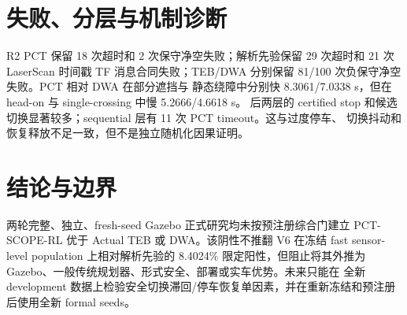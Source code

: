 \section{失败、分层与机制诊断}
R2 PCT 保留 18 次超时和 2 次保守净空失败；解析先验保留 29 次超时和 21 次 LaserScan 时间戳
TF 消息合同失败；TEB/DWA 分别保留 81/100 次负保守净空失败。PCT 相对 DWA 在部分遮挡与
静态绕障中分别快 8.3061/7.0338 s，但在 head-on 与 single-crossing 中慢 5.2666/4.6618 s。
后两层的 certified stop 和候选切换显著较多；sequential 层有 11 次 PCT timeout。这与过度停车、
切换抖动和恢复释放不足一致，但不是独立随机化因果证明。

\section{结论与边界}
两轮完整、独立、fresh-seed Gazebo 正式研究均未按预注册综合门建立 PCT-SCOPE-RL 优于 Actual
TEB 或 DWA。该阴性不推翻 V6 在冻结 fast sensor-level population 上相对解析先验的 8.4024\%
限定阳性，但阻止将其外推为 Gazebo、一般传统规划器、形式安全、部署或实车优势。未来只能在
全新 development 数据上检验安全切换滞回/停车恢复单因素，并在重新冻结和预注册后使用全新
formal seeds。
